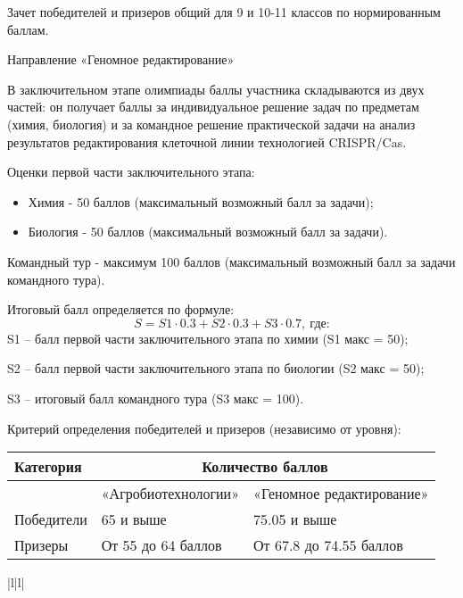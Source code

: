 Зачет победителей и призеров общий для 9 и 10-11 классов по нормированным баллам.

Направление «Геномное редактирование» 

В заключительном этапе олимпиады баллы участника складываются из двух частей: он получает баллы за индивидуальное решение задач по предметам (химия, биология) и за командное решение практической задачи на анализ результатов редактирования клеточной линии технологией CRISPR/Cas.

Оценки первой части заключительного этапа:
\begin{itemize}
    \item Химия  - 50 баллов (максимальный возможный балл за задачи);
    \item Биология  - 50 баллов (максимальный возможный балл за задачи).
\end{itemize}

Командный тур - максимум 100 баллов (максимальный возможный балл за задачи командного тура).

Итоговый балл определяется по формуле: $$S = S1 \cdot 0.3 + S2 \cdot 0.3 + S3 \cdot 0.7, \: \text{где:}$$
S1 – балл первой части заключительного этапа по химии (S1 макс = 50);

S2 – балл первой части заключительного этапа по биологии (S2 макс = 50);

S3 – итоговый балл командного тура (S3 макс = 100).

Критерий определения победителей и призеров (независимо от уровня):
\begin{center}
    \begin{tabular}{|l|l|l|}
        \hline
        Категория& \multicolumn{2}{|c|}{Количество баллов} \\
        \hline
        &«Агробиотехнологии»&«Геномное редактирование»\\
        \hline
        Победители&65 и выше&75.05 и выше\\
        \hline
        Призеры&От 55 до 64 баллов&От 67.8 до 74.55 баллов\\
        \hline
    \end{tabular}{|l|l|}
\end{center}